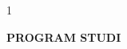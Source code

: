 \begin{titlepage}
\vspace{2\baselineskip}

\begin{spacing}{1}
\begin{center}
{\fontsize{16}{19.2}\selectfont\bfseries
 PROGRAM STUDI \MakeUppercase{\prodi}\par
 \MakeUppercase{\institusi}\par
 \tahun\par}
\end{center}
\end{spacing}

\end{titlepage}
